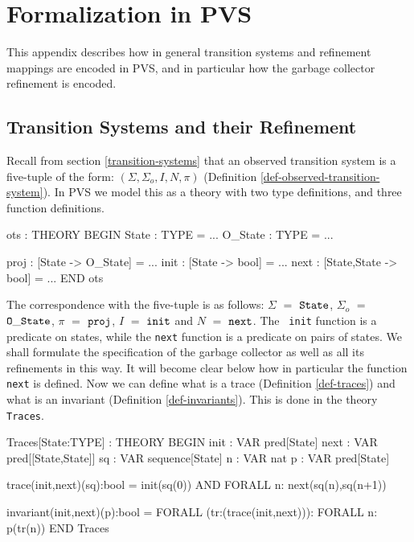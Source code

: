           
\section{Formalization in PVS}
\label{pvs-specifications}

This  appendix   describes   how in  general  transition   systems  and
refinement mappings   are encoded in  PVS,  and in particular  how the
garbage collector refinement is encoded.  


\subsection{Transition Systems and their Refinement}

Recall     from  section  \ref{transition-systems}    that an observed
transition   system      is    a      five-tuple   of     the    form:
$(\Sigma,\Sigma_o,I,N,\pi)$                                (Definition
\ref{def-observed-transition-system})\@. In PVS  we  model this as a  theory
with two type definitions, and  three function definitions.

\begin{smallsession}
ots : THEORY
BEGIN
  State   : TYPE = ...
  O_State : TYPE = ...

  proj : [State -> O_State] = ...
  init : [State -> bool] = ...
  next : [State,State -> bool] = ...
END ots
\end{smallsession}

The  correspondence with the   five-tuple is as follows: $\Sigma$  $=$
${\tt  State}$,  $\Sigma_o$  $=$  ${\tt O\_State}$,   $\pi$  $=$ ${\tt
  proj}$, $I$ $=$ ${\tt  init}$ and $N$  $=$  ${\tt next}$.  The  {\tt
  init} function  is  a predicate  on  states,  while the  {\tt  next}
function  is a predicate on  pairs of states.   We shall formulate the
specification of the garbage collector  as well as all its refinements
in this  way.   It  will become clear   below how  in   particular the
function {\tt  next} is defined.   Now we can  define  what is a trace
(Definition \ref{def-traces}) and what   is an  invariant  (Definition
\ref{def-invariants})\@.   This is  done in  the theory  {\tt Traces}.

\begin{smallsession}
Traces[State:TYPE] : THEORY
BEGIN
  init : VAR pred[State]
  next : VAR pred[[State,State]]
  sq   : VAR sequence[State]
  n    : VAR nat
  p    : VAR pred[State]
  
  trace(init,next)(sq):bool = 
    init(sq(0)) AND FORALL n: next(sq(n),sq(n+1))

  invariant(init,next)(p):bool =
    FORALL (tr:(trace(init,next))): FORALL n: p(tr(n))
END Traces
\end{smallsession}
\label{pvs-traces}

